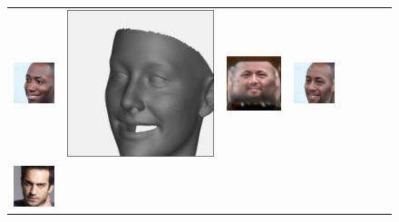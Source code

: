 \begin{figure}[t!]
\begin{center}
\begin{tabular}{ @{\hskip 1.5mm}c@{\hskip 1.5mm}c@{\hskip 1.5mm}c@{\hskip 1.5mm}c@{}c@{}c@{}c@{\hskip 1.5mm}c@{}}
\includegraphics[width=\FittingFigWid]{img/results/CelebA/pred_CelebA_tex_133_in.png} &
\includegraphics[trim=3 3 3 3,clip,width=\FittingFigShapeWid]{img/results/CelebA/pred_CelebA_shape_133.png} &
\includegraphics[width=\FittingFigWid]{img/results/CelebA/pred_CelebA_tex_133.png} &
\includegraphics[width=\FittingFigWid]{img/results/CelebA/pred_CelebA_tex_133_img.png} &
\\
\includegraphics[width=\FittingFigWid]{img/results/CelebA/pred_CelebA_tex_159_in.png} &

\end{tabular}
\end{center}
\end{figure}
